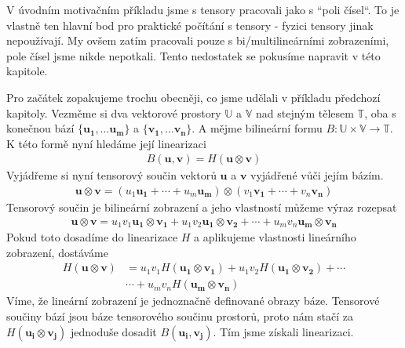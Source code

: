 \documentclass[a5paper,12pt]{amsbook}
\theoremstyle{definition}
\newcommand{\myvec}[1]{\bm{#1}}
\newcommand{\myspace}[1]{\mathbb{#1}}
\begin{document}
\noindent
V úvodním motivačním příkladu jsme s tensory pracovali jako s ``poli čísel``. To je vlastně ten
hlavní bod pro praktické počítání s tensory - fyzici tensory jinak nepoužívají. My ovšem zatím
pracovali pouze s bi/multilineárními zobrazeními, pole čísel jsme nikde nepotkali. Tento nedostatek
se pokusíme napravit v této kapitole.

Pro začátek zopakujeme trochu obecněji, co jsme udělali v příkladu předchozí kapitoly. Vezměme si
dva vektorové prostory $\myspace{U}$ a $\myspace{V}$ nad stejným tělesem $\myspace{T}$, oba s konečnou
bází $\{\myvec{u_1},\hdots\myvec{u_m}\}$ a $\{\myvec{v_1},\hdots\myvec{v_n}\}$. A mějme bilineární
formu $B: \myspace{U}\times\myspace{V}\rightarrow\myspace{T}$. K této formě nyní hledáme její linearizaci
\begin{equation*}
\begin{split}
B(\myvec{u}, \myvec{v}) = H(\myvec{u}\otimes\myvec{v})
\end{split}
\end{equation*}
Vyjádřeme si nyní tensorový součin vektorů $\myvec{u}$ a $\myvec{v}$ vyjádřené vůči jejím bázím.
\begin{equation*}
\begin{split}
\myvec{u}\otimes\myvec{v} = \left(u_1\myvec{u_1} + \cdots + u_m\myvec{u_m}\right)\otimes\left(v_1\myvec{v_1} + \cdots + v_n\myvec{v_n}\right)
\end{split}
\end{equation*}
Tensorový součin je bilineární zobrazení a jeho vlastností můžeme výraz rozepsat
\begin{equation*}
\begin{split}
\myvec{u}\otimes\myvec{v} = u_1 v_1\myvec{u_1}\otimes\myvec{v_1} + u_1 v_2\myvec{u_1}\otimes\myvec{v_2} 
  + \cdots + u_m v_n\myvec{u_m}\otimes\myvec{v_n}
\end{split}
\end{equation*}
Pokud toto dosadíme do linearizace $H$ a aplikujeme vlastnosti lineárního zobrazení, dostáváme
\begin{equation*}
\begin{split}
H(\myvec{u}\otimes\myvec{v}) &= u_1 v_1H(\myvec{u_1}\otimes\myvec{v_1}) 
  + u_1 v_2H(\myvec{u_1}\otimes\myvec{v_2}) + \cdots \\
  &\cdots + u_m v_nH(\myvec{u_m}\otimes\myvec{v_n})
\end{split}
\end{equation*}
Víme, že lineární zobrazení je jednoznačně definované obrazy báze. Tensorové součiny bází
jsou báze tensorového součinu prostorů, proto nám stačí za $H(\myvec{u_i}\otimes\myvec{v_j})$
jednoduše dosadit $B(\myvec{u_i}, \myvec{v_j})$. Tím jsme získali linearizaci.
\end{document}

